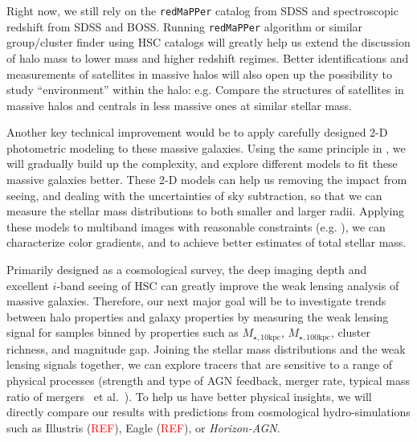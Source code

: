 \documentclass{emulateapj}
\def\etal{{\ et al.~}}
\def\redm{\texttt{redMaPPer}}
\def\minn{{$M_{\star,10\mathrm{kpc}}$}}
\def\mtot{{$M_{\star,100\mathrm{kpc}}$}}
\newcommand{\addref}{{\textcolor{red}{REF}}}
\begin{document}
\begin{CJK*}{UTF8}{gbsn}
    Right now, we still rely on the \redm{} catalog from SDSS and spectroscopic 
    redshift from SDSS and BOSS.  
    Running \redm{} algorithm or similar group/cluster finder using HSC catalogs 
    will greatly help us extend the discussion of halo mass to lower mass and 
    higher redshift regimes. 
    Better identifications and measurements of satellites in massive halos will 
    also open up the possibility to study ``environment'' within the halo: e.g. 
    Compare the structures of satellites in massive halos and centrals in less 
    massive ones at similar stellar mass. 
    
    Another key technical improvement would be to apply carefully designed 2-D 
    photometric modeling to these massive galaxies.  
    Using the same principle in \citealt{Huang2013a}, we will gradually build up 
    the complexity, and explore different models to fit these massive galaxies 
    better.  
    These 2-D models can help us removing the impact from seeing, and dealing with 
    the uncertainties of sky subtraction, so that we can measure the stellar mass 
    distributions to both smaller and larger radii. 
    Applying these models to multiband images with reasonable constraints (e.g. 
    \citealt{Huang2016}), we can characterize color gradients, and to achieve better
    estimates of total stellar mass. 
    
    Primarily designed as a cosmological survey, the deep imaging depth and 
    excellent $i$-band seeing of HSC can greatly improve the weak lensing analysis 
    of massive galaxies. 
    Therefore, our next major goal will be to investigate trends between halo 
    properties and galaxy properties by measuring the weak lensing signal for samples 
    binned by properties such as \minn{}, \mtot{}, cluster richness, and magnitude gap.
    Joining the stellar mass distributions and the weak lensing signals together, 
    we can explore tracers that are sensitive to a range of physical processes 
    (strength and type of AGN feedback, merger rate, typical mass ratio of mergers
    \etal). 
    To help us have better physical insights, we will directly compare our results 
    with predictions from cosmological hydro-simulations such as 
    Illustris (\addref{}), Eagle (\addref{}), or \textit{Horizon-AGN}. 

  
  
\acknowledgements


\end{CJK*}
\end{document}
